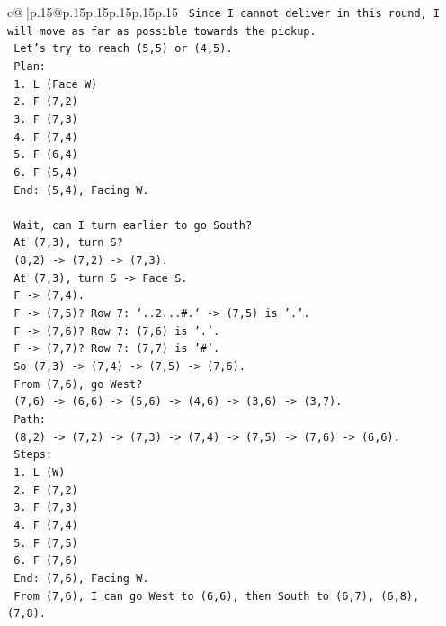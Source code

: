 \documentclass{article}
\begin{document}
{\begin{supertabular}{c@{$\;$}|p{.15\linewidth}@{}p{.15\linewidth}p{.15\linewidth}p{.15\linewidth}p{.15\linewidth}p{.15\linewidth}}
{{{\texttt{   Since I cannot deliver in this round, I will move as far as possible towards the pickup.} \\
\texttt{   Let's try to reach (5,5) or (4,5).} \\
\texttt{   Plan:} \\
\texttt{   1. L (Face W)} \\
\texttt{   2. F (7,2)} \\
\texttt{   3. F (7,3)} \\
\texttt{   4. F (7,4)} \\
\texttt{   5. F (6,4)} \\
\texttt{   6. F (5,4)} \\
\texttt{   End: (5,4), Facing W.} \\
\\ 
\texttt{   Wait, can I turn earlier to go South?} \\
\texttt{   At (7,3), turn S?} \\
\texttt{   (8,2) {-}> (7,2) {-}> (7,3).} \\
\texttt{   At (7,3), turn S {-}> Face S.} \\
\texttt{   F {-}> (7,4).} \\
\texttt{   F {-}> (7,5)? Row 7: `..2...\#.` {-}> (7,5) is '.'.} \\
\texttt{   F {-}> (7,6)? Row 7: (7,6) is '.'.} \\
\texttt{   F {-}> (7,7)? Row 7: (7,7) is '\#'.} \\
\texttt{   So (7,3) {-}> (7,4) {-}> (7,5) {-}> (7,6).} \\
\texttt{   From (7,6), go West?} \\
\texttt{   (7,6) {-}> (6,6) {-}> (5,6) {-}> (4,6) {-}> (3,6) {-}> (3,7).} \\
\texttt{   Path:} \\
\texttt{   (8,2) {-}> (7,2) {-}> (7,3) {-}> (7,4) {-}> (7,5) {-}> (7,6) {-}> (6,6).} \\
\texttt{   Steps:} \\
\texttt{   1. L (W)} \\
\texttt{   2. F (7,2)} \\
\texttt{   3. F (7,3)} \\
\texttt{   4. F (7,4)} \\
\texttt{   5. F (7,5)} \\
\texttt{   6. F (7,6)} \\
\texttt{   End: (7,6), Facing W.} \\
\texttt{   From (7,6), I can go West to (6,6), then South to (6,7), (6,8), (7,8).} \\
}}}
\end{supertabular}}
\end{document}
